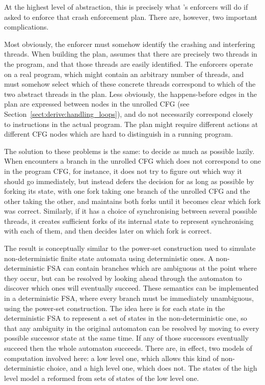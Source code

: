 At the highest level of abstraction, this is precisely what
{\implementation}'s enforcers will do if asked to enforce that crash
enforcement plan.  There are, however, two important complications.

Most obviously, the enforcer must somehow identify the crashing and
interfering threads.  When building the plan, {\technique} assumes
that there are precisely two threads in the program, and that those
threads are easily identified.  The enforcers operate on a real
program, which might contain an arbitrary number of threads, and must
somehow select which of these concrete threads correspond to which of
the two abstract threads in the plan.  Less obviously, the
happens-before edges in the plan are expressed between nodes in the
unrolled CFG (see Section~\ref{sect:derive:handling_loops}), and do
not necessarily correspond closely to instructions in the actual
program.  The plan might require different actions at different CFG
nodes which are hard to distinguish in a running program.

The solution to these problems is the same: to decide as much as
possible lazily.  When {\implementation} encounters a branch in the
unrolled CFG which does not correspond to one in the program CFG, for
instance, it does not try to figure out which way it should go
immediately, but instead defers the decision for as long as possible
by forking its state, with one fork taking one branch of the unrolled
CFG and the other taking the other, and maintains both forks until it
becomes clear which fork was correct.  Similarly, if it has a choice
of synchronising between several possible threads, it creates
sufficient forks of its internal state to represent synchronising with
each of them, and then decides later on which fork is correct.

The result is conceptually similar to the power-set construction used
to simulate non-deterministic finite state automata using
deterministic ones\needCite{}.  A non-deterministic FSA can contain
branches which are ambiguous at the point where they occur, but can be
resolved by looking ahead through the automaton to discover which ones
will eventually succeed.  These semantics can be implemented in a
deterministic FSA, where every branch must be immediately unambiguous,
using the power-set construction.  The idea here is for each state in
the deterministic FSA to represent a set of states in the
non-deterministic one, so that any ambiguity in the original automaton
can be resolved by moving to every possible successor state at the
same time.  If any of those successors eventually succeed then the
whole automaton succeeds.  There are, in effect, two models of
computation involved here: a low level one, which allows this kind of
non-deterministic choice, and a high level one, which does not.  The
states of the high level model a reformed from sets of states of the
low level one.


